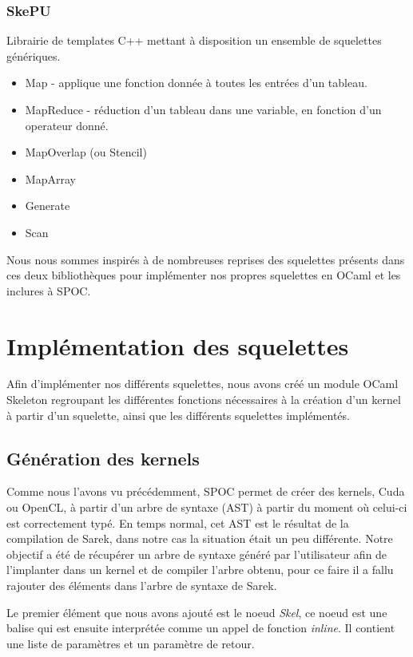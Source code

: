 \documentclass{report}
\begin{document}
\subsubsection{SkePU}

Librairie de templates C++ mettant à disposition un ensemble de squelettes génériques.

\begin{itemize}
\item Map\cite{refMap} - applique une fonction donnée à toutes les entrées d’un tableau.
\item MapReduce - réduction d’un tableau dans une variable, en fonction d’un operateur donné.
\item MapOverlap (ou Stencil)
\item MapArray
\item Generate
\item Scan
\end{itemize}

Nous nous sommes inspirés à de nombreuses reprises des squelettes présents dans ces deux bibliothèques pour implémenter nos propres squelettes en OCaml et les inclures à SPOC.

\newpage
\section{Implémentation des squelettes}

Afin d'implémenter nos différents squelettes, nous avons créé un module OCaml Skeleton regroupant les différentes fonctions nécessaires à la création d'un kernel à partir d'un squelette, ainsi que les différents squelettes implémentés. 

\subsection{Génération des kernels}

Comme nous l'avons vu précédemment, SPOC permet de créer des kernels, Cuda ou OpenCL, à partir d'un arbre de syntaxe (AST) à partir du moment où celui-ci est correctement typé. En temps normal, cet AST est le résultat de la compilation de Sarek, dans notre cas la situation était un peu différente. Notre objectif a été de récupérer un arbre de syntaxe généré par l'utilisateur afin de l'implanter dans un kernel et de compiler l'arbre obtenu, pour ce faire il a fallu rajouter des éléments dans l'arbre de syntaxe de Sarek.\newline

Le premier élément que nous avons ajouté est le noeud \textit{Skel}, ce noeud est une balise qui est ensuite interprétée comme un appel de fonction \textit{inline}. Il contient une liste de paramètres et un paramètre de retour. \newline
\end{document}
